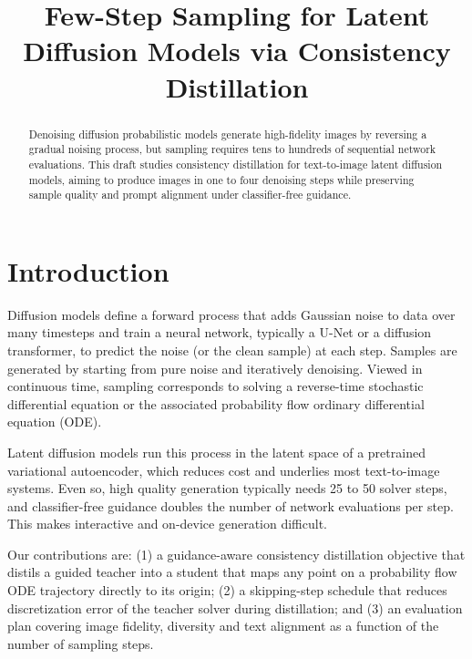 \documentclass{article}
\title{Few-Step Sampling for Latent Diffusion Models via Consistency Distillation}
\begin{document}
\maketitle

\begin{abstract}
Denoising diffusion probabilistic models generate high-fidelity images by
reversing a gradual noising process, but sampling requires tens to hundreds of
sequential network evaluations. This draft studies consistency distillation
for text-to-image latent diffusion models, aiming to produce images in one to
four denoising steps while preserving sample quality and prompt alignment
under classifier-free guidance.
\end{abstract}

\section{Introduction}
Diffusion models define a forward process that adds Gaussian noise to data over
many timesteps and train a neural network, typically a U-Net or a diffusion
transformer, to predict the noise (or the clean sample) at each step. Samples
are generated by starting from pure noise and iteratively denoising. Viewed in
continuous time, sampling corresponds to solving a reverse-time stochastic
differential equation or the associated probability flow ordinary
differential equation (ODE).

Latent diffusion models run this process in the latent space of a pretrained
variational autoencoder, which reduces cost and underlies most text-to-image
systems. Even so, high quality generation typically needs 25 to 50 solver
steps, and classifier-free guidance doubles the number of network evaluations
per step. This makes interactive and on-device generation difficult.

Our contributions are: (1) a guidance-aware consistency distillation objective
that distils a guided teacher into a student that maps any point on a
probability flow ODE trajectory directly to its origin; (2) a skipping-step
schedule that reduces discretization error of the teacher solver during
distillation; and (3) an evaluation plan covering image fidelity, diversity and
text alignment as a function of the number of sampling steps.
\end{document}
